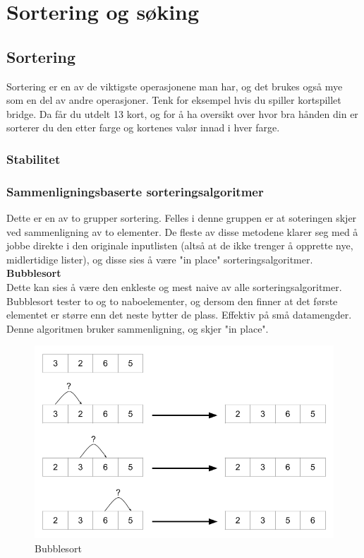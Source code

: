 \section{Sortering og søking}

\subsection{Sortering}
Sortering er en av de viktigste operasjonene man har, og det brukes også mye som en del av andre operasjoner. Tenk for eksempel hvis du spiller kortspillet bridge. Da får du utdelt 13 kort, og for å ha oversikt over hvor bra hånden din er sorterer du den etter farge og kortenes valør innad i hver farge.

\subsubsection{Stabilitet}

\subsubsection{Sammenligningsbaserte sorteringsalgoritmer}
Dette er en av to grupper sortering. Felles i denne gruppen er at soteringen skjer ved sammenligning av to elementer. De fleste av disse metodene klarer seg med å jobbe direkte i den originale inputlisten (altså at de ikke trenger å opprette nye, midlertidige lister), og disse sies å være "in place" sorteringsalgoritmer.\\

\noindent \textbf{Bubblesort}\\
Dette kan sies å være den enkleste og mest naive av alle sorteringsalgoritmer. Bubblesort tester to og to naboelementer, og dersom den finner at det første elementet er større enn det neste bytter de plass. Effektiv på små datamengder. Denne algoritmen bruker sammenligning, og skjer "in place".

\begin{figure}[H]
\includegraphics[scale=0.5]{images/bubblesort}
\centering %
\caption{Bubblesort}
\label{fig:bubblesort}
\end{figure}

